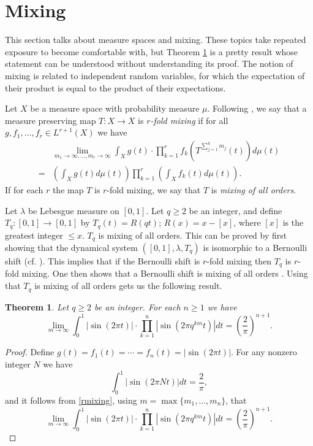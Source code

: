 \documentclass{article}
\newtheorem{theorem}{Theorem}
\begin{document}
\section{Mixing}
This section talks about measure spaces and mixing. These topics take repeated exposure to become comfortable with,
but Theorem \ref{allorders} is a pretty result whose statement can be understood without understanding its proof.
The notion of mixing is related to independent random variables,
for which the expectation of their product is equal to the product of their expectations.

Let $X$ be a measure space with probability measure $\mu$. Following  \cite[p.~21, Definition 3.6]{EMS}, we say that a measure preserving map $T:X \to X$ is {\em $r$-fold mixing}
if for all $g,f_1,\ldots,f_r \in L^{r+1}(X)$ we have 
\begin{equation}
\begin{split}
&\lim_{m_1 \to \infty,\ldots,m_r \to \infty} \int_X g(t) \cdot \prod_{k=1}^r f_k\left(T^{\sum_{j=1}^k m_j}(t)\right)
d\mu(t)\\
=&\left(\int_X g(t) d\mu(t)\right) \prod_{k=1}^r \left( \int_X f_k(t) d\mu(t) \right).
\end{split}
\label{rmixing}
\end{equation}
If for each $r$ the map $T$ is $r$-fold mixing, we say that $T$ is {\em mixing of all orders}.


Let $\lambda$ be Lebesgue measure on $[0,1]$. Let $q \geq 2$ be an integer, and define $T_q:[0,1] \to [0,1]$ by 
$T_q(t)=R(qt)$; $R(x)=x-[x]$, where $[x]$ is the greatest integer $\leq x$. $T_q$ is mixing of all orders. This can be proved by first showing that
the dynamical system $([0,1],\lambda,T_q)$ is  isomorphic to a Bernoulli shift (cf. \cite[p.~17, Example 2.8]{einsiedler}). This implies that if the Bernoulli shift is $r$-fold mixing then
$T_q$ is $r$-fold mixing. One then shows that a Bernoulli shift is mixing of all orders
\cite[p.~53, Exercise 2.7.9]{einsiedler}. Using that $T_q$ is mixing of all orders gets us the following result.


\begin{theorem}
Let $q \geq 2$ be an integer. For each $n \geq 1$ we have
\[
\lim_{m \to \infty} \int_0^1 |\sin(2\pi t)| \cdot \prod_{k=1}^n \left| \sin\left(2\pi q^{km} t\right) \right|  dt
= \left( \frac{2}{\pi} \right)^{n+1}.
\]
\label{allorders}
\end{theorem}
\begin{proof}
Define
$g(t)=f_1(t)=\cdots=f_n(t)=|\sin(2\pi t)|$. For any nonzero integer $N$ we have
\[
\int_0^1 |\sin(2\pi N t)| dt=\frac{2}{\pi},
\]
and it follows from \eqref{rmixing}, using $m=\max\{m_1,\ldots,m_n\}$, that
\[
\lim_{m \to \infty} \int_0^1 |\sin(2\pi t)| \cdot \prod_{k=1}^n \left| \sin\left(2\pi q^{km} t\right) \right|  dt
= \left( \frac{2}{\pi} \right)^{n+1}.
\]
\end{proof}
\end{document}
